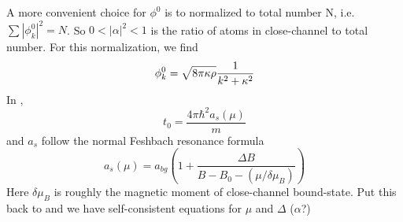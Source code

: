 \subsection{}
A more convenient choice for $\phi^{0}$ is to normalized to total number N, i.e. $\sum|\phi^{0}_{k}|^{2}=N$.  So $0<|\alpha|^{2}<1$ is the ratio of atoms in close-channel to total number.  For this normalization, we find 
\begin{equation}
\phi^{0}_{k}=\sqrt{8\pi\kappa\rho}\frac{1}{k^{2}+\kappa^{2}}
\end{equation}
In , 
\[
t_{0}=\frac{4\pi\hbar^{2}a_{s}(\mu)}{m}
\]
and $a_{s}$ follow the normal Feshbach resonance formula
\begin{equation}
a_{s}(\mu)=a_{bg}(1+\frac{\Delta{B}}{B-B_{0}-(\mu/\delta\mu_{B})})
\end{equation}
Here $\delta\mu_{B}$ is roughly the magnetic moment of close-channel bound-state.   Put this back to   and we have self-consistent equations for $\mu$ and $\Delta$ ($\alpha$?)
